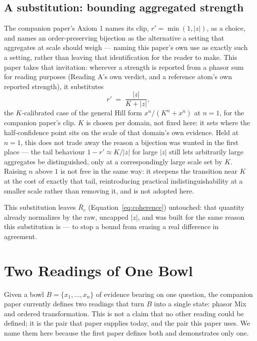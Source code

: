 \documentclass[12pt, a4paper]{article}
\begin{document}
\subsection{A substitution: bounding aggregated strength}
\label{subsec:bijection_substitution}

The companion paper's Axiom 1 names its clip, $r'=\min(1,|z|)$, as a
choice, and names an order-preserving bijection as the alternative a
setting that aggregates at scale should weigh --- naming this paper's
own use as exactly such a setting, rather than leaving that
identification for the reader to make. This paper takes that
invitation: wherever a strength is reported from a phasor sum for
reading purposes (Reading A's own verdict, and a reference atom's own
reported strength), it substitutes
\begin{equation}
    r' \;=\; \frac{|z|}{K+|z|},
    \label{eq:bijection}
\end{equation}
the $K$-calibrated case of the general Hill form $x^n/(K^n+x^n)$ at
$n=1$, for the companion paper's clip. $K$ is chosen per domain, not
fixed here: it sets where the half-confidence point sits on the scale
of that domain's own evidence. Held at $n=1$, this does not trade away
the reason a bijection was wanted in the first place --- the tail
behaviour $1-r'\approx K/|z|$ for large $|z|$ still lets arbitrarily
large aggregates be distinguished, only at a correspondingly large
scale set by $K$. Raising $n$ above $1$ is not free in the same way:
it steepens the transition near $K$ at the cost of exactly that tail,
reintroducing practical indistinguishability at a smaller scale rather
than removing it, and is not adopted here.

This substitution leaves $\bar R_c$ (Equation~\eqref{eq:coherence})
untouched: that quantity already normalizes by the raw, uncapped
$|z|$, and was built for the same reason this substitution is --- to
stop a bound from erasing a real difference in agreement.

\section{Two Readings of One Bowl}
\label{sec:two_readings}

Given a bowl $B=\{x_1,\ldots,x_n\}$ of evidence bearing on one
question, the companion paper currently defines two readings that turn
$B$ into a single state: phasor Mix and ordered transformation. This is
not a claim that no other reading could be defined; it is the pair
that paper supplies today, and the pair this paper uses. We name them
here because the first paper defines both and demonstrates only one.
\end{document}
